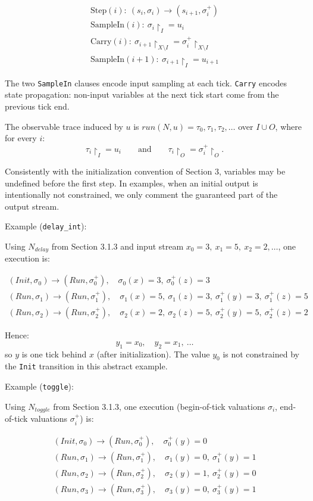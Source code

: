 \documentclass[
]{article}
\begin{document}
\[
\begin{array}{l}
\text{Step}(i):\ (s_i,\sigma_i)\to(s_{i+1},\sigma_i^+)\\
\text{SampleIn}(i):\ \sigma_i\!\upharpoonright_I = u_i\\
\text{Carry}(i):\ \sigma_{i+1}\!\upharpoonright_{X\setminus I} = \sigma_i^+\!\upharpoonright_{X\setminus I}\\
\text{SampleIn}(i+1):\ \sigma_{i+1}\!\upharpoonright_I = u_{i+1}
\end{array}
\]

The two \texttt{SampleIn} clauses encode input sampling at each tick.
\texttt{Carry} encodes state propagation: non-input variables at the
next tick start come from the previous tick end.

The observable trace induced by \(u\) is
\(run(N,u)=\tau_0,\tau_1,\tau_2,\dots\) over \(I\cup O\), where for
every \(i\): \[
\tau_i\!\upharpoonright_I=u_i
\qquad\text{and}\qquad
\tau_i\!\upharpoonright_O=\sigma_i^+\!\upharpoonright_O.
\]

Consistently with the initialization convention of Section 3, variables
may be undefined before the first step. In examples, when an initial
output is intentionally not constrained, we only comment the guaranteed
part of the output stream.

Example (\texttt{delay\_int}):

Using \(N_{delay}\) from Section 3.1.3 and input stream
\(x_0=3,\ x_1=5,\ x_2=2,\dots\), one execution is:

\[
\begin{array}{l}
(Init,\sigma_0)\to(Run,\sigma_0^+),\quad \sigma_0(x)=3,\ \sigma_0^+(z)=3\\
(Run,\sigma_1)\to(Run,\sigma_1^+),\quad \sigma_1(x)=5,\ \sigma_1(z)=3,\ \sigma_1^+(y)=3,\ \sigma_1^+(z)=5\\
(Run,\sigma_2)\to(Run,\sigma_2^+),\quad \sigma_2(x)=2,\ \sigma_2(z)=5,\ \sigma_2^+(y)=5,\ \sigma_2^+(z)=2
\end{array}
\]

Hence: \[
y_1 = x_0,\quad y_2 = x_1,\ \dots
\] so \(y\) is one tick behind \(x\) (after initialization). The value
\(y_0\) is not constrained by the \texttt{Init} transition in this
abstract example.

Example (\texttt{toggle}):

Using \(N_{toggle}\) from Section 3.1.3, one execution (begin-of-tick
valuations \(\sigma_i\), end-of-tick valuations \(\sigma_i^+\)) is:

\[
\begin{array}{l}
(Init,\sigma_0)\to(Run,\sigma_0^+),\quad \sigma_0^+(y)=0\\
(Run,\sigma_1)\to(Run,\sigma_1^+),\quad \sigma_1(y)=0,\ \sigma_1^+(y)=1\\
(Run,\sigma_2)\to(Run,\sigma_2^+),\quad \sigma_2(y)=1,\ \sigma_2^+(y)=0\\
(Run,\sigma_3)\to(Run,\sigma_3^+),\quad \sigma_3(y)=0,\ \sigma_3^+(y)=1
\end{array}
\]
\end{document}
